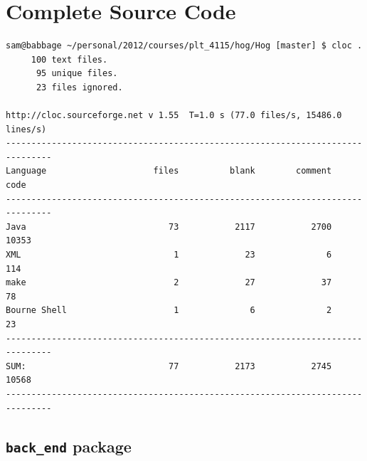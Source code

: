\documentclass{report}
\begin{document}
\chapter{Complete Source Code}

\begin{verbatim}
sam@babbage ~/personal/2012/courses/plt_4115/hog/Hog [master] $ cloc .
     100 text files.
      95 unique files.                              
      23 files ignored.

http://cloc.sourceforge.net v 1.55  T=1.0 s (77.0 files/s, 15486.0 lines/s)
-------------------------------------------------------------------------------
Language                     files          blank        comment           code
-------------------------------------------------------------------------------
Java                            73           2117           2700          10353
XML                              1             23              6            114
make                             2             27             37             78
Bourne Shell                     1              6              2             23
-------------------------------------------------------------------------------
SUM:                            77           2173           2745          10568
-------------------------------------------------------------------------------

\end{verbatim}

\section{\texttt{back\_end} package}
\end{document}
